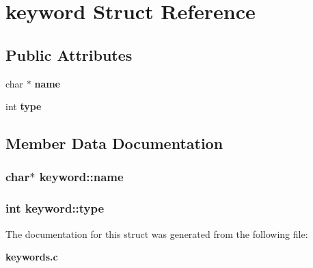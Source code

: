 \section{keyword Struct Reference}
\label{structkeyword}
\subsection*{Public Attributes}
\begin{CompactItemize}
\item 
char $\ast$ {\bf name}
\item 
int {\bf type}
\end{CompactItemize}


\subsection{Member Data Documentation}
\subsubsection{\setlength{\rightskip}{0pt plus 5cm}char$\ast$ {\bf keyword::name}}\label{structkeyword_o0}


\subsubsection{\setlength{\rightskip}{0pt plus 5cm}int {\bf keyword::type}}\label{structkeyword_o1}




The documentation for this struct was generated from the following file:\begin{CompactItemize}
\item 
{\bf keywords.c}\end{CompactItemize}
